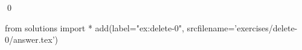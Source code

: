 
\begin{ex} 
  \label{ex:delete-0}
  
  \qed
\end{ex} 
\begin{python0}
from solutions import *
add(label="ex:delete-0",
    srcfilename='exercises/delete-0/answer.tex') 
\end{python0}
